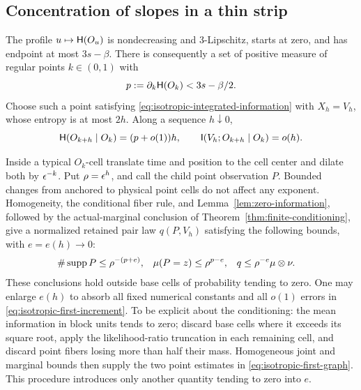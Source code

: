 \subsection{Concentration of slopes in a thin strip}

The profile $u\mapsto\mathsf H(O_u)$ is nondecreasing and $3$-Lipschitz, starts at
zero, and has endpoint at most $3s-\beta$. There is consequently a set of
positive measure of regular points $k\in(0,1)$ with
\begin{equation}
 p:=\partial_k\mathsf H(O_k)<3s-\beta/2.
 \label{eq:isotropic-low-increment}
\end{equation}
Choose such a point satisfying \eqref{eq:isotropic-integrated-information}
with $X_h=V_h$, whose entropy is at most $2h$. Along a sequence $h\downarrow0$,
\begin{equation}
 \mathsf H(O_{k+h}\mid O_k)=(p+o(1))h,\qquad
 \mathsf I(V_h;O_{k+h}\mid O_k)=o(h).
 \label{eq:isotropic-first-increment}
\end{equation}

Inside a typical $O_k$-cell translate time and position to the cell center
and dilate both by $\epsilon^{-k}$. Put $\rho=\epsilon^h$, and call the child point
observation $P$. Bounded changes from anchored to physical point cells do
not affect any exponent. Homogeneity, the conditional fiber rule, and
Lemma~\ref{lem:zero-information}, followed by the actual-marginal conclusion
of Theorem~\ref{thm:finite-conditioning}, give a normalized retained pair law
$q(P,V_h)$ satisfying the following bounds, with $e=e(h)\to0$:
\begin{align}
 \#\operatorname{supp} P&\leq\rho^{-(p+e)},&
 \mu(P=z)&\leq\rho^{p-e},&
 q&\leq\rho^{-e}\mu\otimes\nu.
 \label{eq:isotropic-first-graph}
\end{align}
These conclusions hold outside base cells of probability tending to zero.
One may enlarge $e(h)$ to absorb all fixed numerical constants and all
$o(1)$ errors in \eqref{eq:isotropic-first-increment}. To be explicit about
the conditioning: the mean information in block units tends to zero; discard
base cells where it exceeds its square root, apply the likelihood-ratio
truncation in each remaining cell, and discard point fibers losing more than
half their mass. Homogeneous joint and marginal bounds then supply the two
point estimates in \eqref{eq:isotropic-first-graph}. This procedure introduces
only another quantity tending to zero into $e$.

